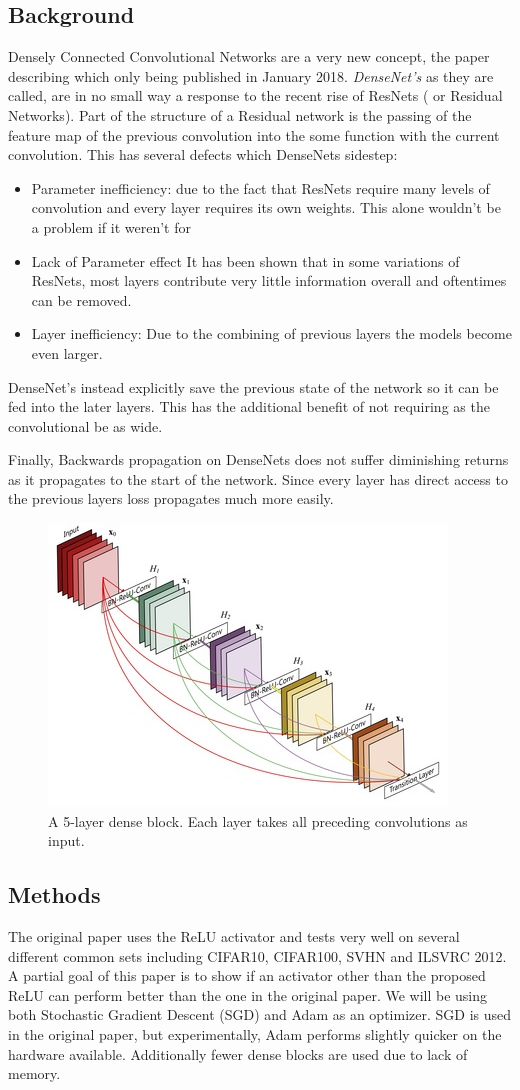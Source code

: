 \documentclass{article}
\begin{document}
\subsection{Background}
Densely Connected Convolutional Networks are a very new concept, the paper describing which only being published in January 2018.
{\it DenseNet's} as they are called, are in no small way a response to the recent rise of ResNets ( or Residual Networks). Part of the structure of a Residual network is the passing of the feature map of the previous convolution into the some function with the current convolution.
This has several defects which DenseNets sidestep:
\begin{itemize}
        \item Parameter inefficiency: due to the fact that ResNets require many levels of convolution and every layer requires its own weights. This alone wouldn't be a problem if it weren't for
        \item Lack of Parameter effect It has been shown that in some variations of ResNets, most layers contribute very little information overall and oftentimes can be removed.
        \item Layer inefficiency: Due to the combining of previous layers the models become even larger.
\end{itemize}
DenseNet's instead explicitly save the previous state of the network so it can be fed into the later layers.
This has the additional benefit of not requiring as the convolutional be as wide.

Finally, Backwards propagation on DenseNets does not suffer diminishing returns as it propagates to the start of the network.
Since every layer has direct access to the previous layers loss propagates much more easily.
\begin{figure}
        \centering
        \includegraphics[width=0.3\linewidth]{figures/dense_block}
        \caption{A 5-layer dense block. Each layer takes all preceding convolutions as input.}
        \label{fig:DenseBlock}
\end{figure}

\subsection{Methods}
The original paper uses the ReLU activator and tests very well on several different common sets including CIFAR10, CIFAR100, SVHN and ILSVRC 2012.
A partial goal of this paper is to show if an activator other than the proposed ReLU can perform better than the one in the original paper.
We will be using both Stochastic Gradient Descent (SGD) and Adam as an optimizer. SGD is used in the original paper, but experimentally, Adam performs slightly quicker on the hardware available.
Additionally fewer dense blocks are used due to lack of memory.
\end{document}
